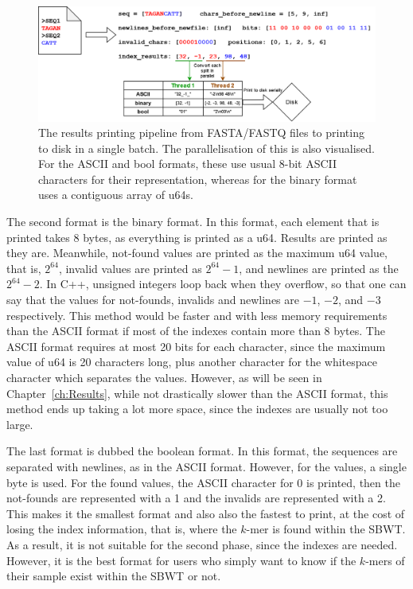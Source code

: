 \begin{figure}[t]
  \centering
  \includegraphics[width=\textwidth]{images/IndexResultsPrinting.png}
  \caption{The results printing pipeline from FASTA/FASTQ files to printing to disk in a single batch. The parallelisation of this is also visualised. For the ASCII and bool formats, these use usual 8-bit ASCII characters for their representation, whereas for the binary format uses a contiguous array of u64s.}\label{fig:IndexResultsPrinting}
\end{figure}

The second format is the binary format.
In this format, each element that is printed takes 8 bytes, as everything is printed as a u64.
Results are printed as they are.
Meanwhile, not-found values are printed as the maximum u64 value, that is, $2^{64}$, invalid values are printed as $2^{64} - 1$, and newlines are printed as the $2^{64} - 2$.
In C++, unsigned integers loop back when they overflow, so that one can say that the values for not-founds, invalids and newlines are $-1$, $-2$, and $-3$ respectively.
This method would be faster and with less memory requirements than the ASCII format if most of the indexes contain more than 8 bytes.
The ASCII format requires at most 20 bits for each character, since the maximum value of u64 is 20 characters long, plus another character for the whitespace character which separates the values.
However, as will be seen in Chapter~\ref{ch:Results}, while not drastically slower than the ASCII format, this method ends up taking a lot more space, since the indexes are usually not too large.

The last format is dubbed the boolean format.
In this format, the sequences are separated with newlines, as in the ASCII format.
However, for the values, a single byte is used.
For the found values, the ASCII character for 0 is printed, then the not-founds are represented with a 1 and the invalids are represented with a 2.
This makes it the smallest format and also also the fastest to print, at the cost of losing the index information, that is, where the $k$-mer is found within the SBWT.
As a result, it is not suitable for the second phase, since the indexes are needed.
However, it is the best format for users who simply want to know if the $k$-mers of their sample exist within the SBWT or not.
